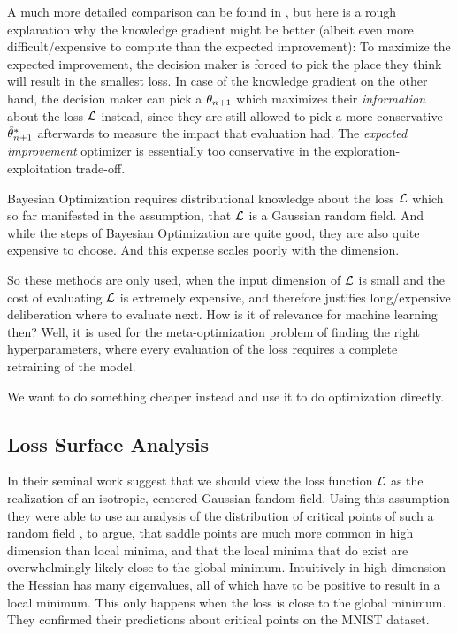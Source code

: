 A much more detailed comparison can be found in \cite{frazierBayesianOptimization2018},
but here is a rough explanation why the knowledge gradient might be better
(albeit even more difficult/expensive to compute than the expected improvement):
To maximize the expected improvement, the decision maker is forced to pick the
place they think will result in the smallest loss. In case of the knowledge
gradient on the other hand, the decision maker can pick a \(\theta_{n+1}\) which
maximizes their \emph{information} about the loss \(\mathcal{L}\) instead, since they
are still allowed to pick a more conservative \(\hat{\theta}^*_{n+1}\)
afterwards to measure the impact that evaluation had. The \emph{expected improvement}
optimizer is essentially too conservative in the exploration-exploitation trade-off. 

Bayesian Optimization requires distributional knowledge
about the loss \(\mathcal{L}\) which so far manifested in the assumption, that
\(\mathcal{L}\) is a Gaussian random field. And while the steps of Bayesian
Optimization are quite good, they are also quite expensive to choose. And this
expense scales poorly with the dimension.

So these methods are only used, when the input dimension of \(\mathcal{L}\) is small
and the cost of evaluating \(\mathcal{L}\) is extremely expensive, and therefore
justifies long/expensive deliberation where to evaluate next. How is it of
relevance for machine learning then? Well, it is used for the meta-optimization
problem of finding the right hyperparameters, where every evaluation of the loss
requires a complete retraining of the model.

We want to do something cheaper instead and use it to do optimization directly.

\subsection{Loss Surface Analysis}

In their seminal work 
\textcite{dauphinIdentifyingAttackingSaddle2014} suggest that we
should view the loss function \(\mathcal{L}\) as the realization of an isotropic,
centered Gaussian fandom field. Using this assumption they were able to use an
analysis of the distribution of critical points of such a random field
\parencite{brayStatisticsCriticalPoints2007}, to argue, that saddle points are
much more common in high dimension than local minima, and that the local minima
that do exist are overwhelmingly likely close to the global minimum. Intuitively
in high dimension the Hessian has many eigenvalues, all of which have to be
positive to result in a local minimum. This only happens when the loss is
close to the global minimum. They confirmed their predictions about critical
points on the MNIST dataset.

